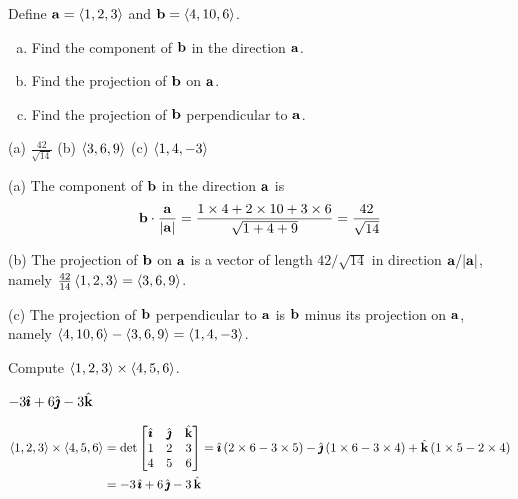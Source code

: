 \begin{question}
Define $\mathbf{a}=\left< 1,2,3\right>$ and $\mathbf{b}=\left< 4,10,6\right>$.
\begin{enumerate}[(a)]
\item
   Find the component of $\mathbf{b}$ in the direction $\mathbf{a}$.
\item
   Find the projection of $\mathbf{b}$ on $\mathbf{a}$.
\item
  Find the projection of $\mathbf{b}$ perpendicular to $\mathbf{a}$.
\end{enumerate}
\end{question}

%

\begin{answer}
(a) $\frac{42}{\sqrt{14}}$\qquad
(b) $\left< 3,6,9\right>$\qquad
(c) $\left< 1,4,-3\right>$
\end{answer}

\begin{solution}
(a) The component of $\mathbf{b}$ in the direction $\mathbf{a}$ is
$$
\mathbf{b}\cdot\frac{\mathbf{a}}{|\mathbf{a}|}
=\frac{1\times 4+2\times 10+3\times 6}{\sqrt{1+4+9}}
=\text{$\frac{42}{\sqrt{14}}$}
$$

(b) The projection of $\mathbf{b}$ on $\mathbf{a}$ is a vector of length
$42/\sqrt{14}$ in direction $\mathbf{a}/|\mathbf{a}|$, namely 
$\frac{42}{14}\left< 1,2,3\right>=\left< 3,6,9\right>$.

(c) The projection of $\mathbf{b}$ perpendicular to $\mathbf{a}$
is $\mathbf{b}$ minus its projection on $\mathbf{a}$, namely
$\left< 4,10,6\right>-\left< 3,6,9\right>=\left< 1,4,-3\right>$.
\end{solution}



\begin{question}
Compute $\left< 1,2,3\right>\times\left< 4,5,6\right>$.
\end{question}


\begin{answer}
$-3\hat{\pmb{\imath}}+6\hat{\pmb{\jmath}}-3\hat{\mathbf{k}}$
\end{answer}

\begin{solution}
\begin{align*}
\left< 1,2,3\right>\times\left< 4,5,6\right>
 &=\det\left[\begin{matrix}\hat{\pmb{\imath}}&\hat{\pmb{\jmath}} &\hat{\mathbf{k}} \\
                     1&2&3 \\
                     4&5&6\end{matrix}\right]
=\hat{\pmb{\imath}}\,(2\times 6-3\times 5)
-\hat{\pmb{\jmath}}\,(1\times 6-3\times 4)
+\hat{\mathbf{k}}\,(1\times 5-2\times 4) \\
&=-3\,\hat{\pmb{\imath}}+6\,\hat{\pmb{\jmath}}-3\,\hat{\mathbf{k}}
\end{align*}
\end{solution}


